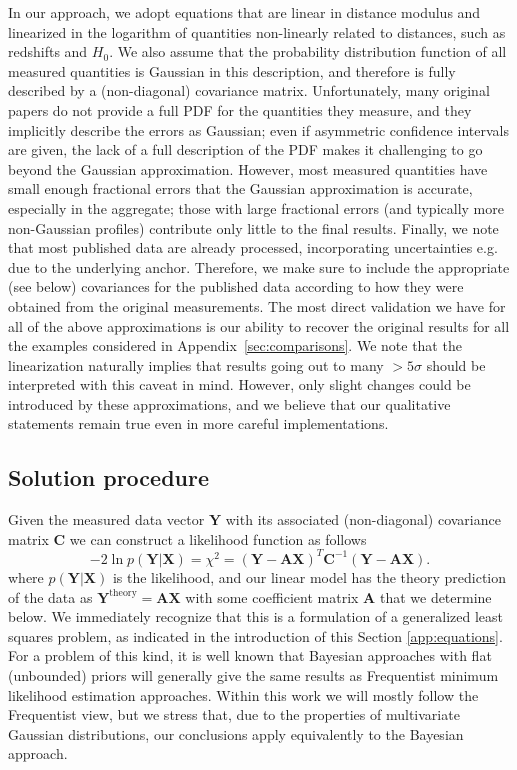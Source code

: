 In our approach, we adopt equations that are linear in distance modulus and linearized in the logarithm of quantities non-linearly related to distances, such as redshifts and $ H_0 $.  We also assume that the probability distribution function of all measured quantities is Gaussian in this description, and therefore is fully described by a (non-diagonal) covariance matrix. Unfortunately, many original papers do not provide a full PDF for the quantities they measure, and they implicitly describe the errors as Gaussian; even if asymmetric confidence intervals are given, the lack of a full description of the PDF makes it challenging to go beyond the Gaussian approximation. However, most measured quantities have small enough fractional errors that the Gaussian approximation is accurate, especially in the aggregate; those with large fractional errors (and typically more non-Gaussian profiles) contribute only little to the final results. Finally, we note that most published data are already processed, incorporating uncertainties e.g. due to the underlying anchor. Therefore, we make sure to include the appropriate (see below) covariances for the published data according to how they were obtained from the original measurements. The most direct validation we have for all of the above approximations is our ability to recover the original results for all the examples considered in Appendix~\ref{sec:comparisons}. We note that the linearization naturally implies that results going out to many $>5\sigma$ should be interpreted with this caveat in mind. However, only slight changes could be introduced by these approximations, and we believe that our qualitative statements remain true even in more careful implementations.

\subsection{Solution procedure}

Given the measured data vector $\mathbf{Y}$ with its associated (non-diagonal) covariance matrix $\mathbf{C}$ we can construct a likelihood function as follows
\begin{equation}
    -2 \ln p(\mathbf{Y}|\mathbf{X}) = \chi^2 = (\mathbf{Y - A X})^T \mathbf {C}^{-1} (\mathbf{Y - A X}).\label{eq:chisq_definition}
\end{equation}
where $p(\mathbf{Y}|\mathbf{X})$ is the likelihood, and our linear model has the theory prediction of the data as $\mathbf{Y}^\mathrm{theory} = \mathbf{A} \mathbf{X}$ with some coefficient matrix $\mathbf{A}$ that we determine below. We immediately recognize that this is a formulation of a generalized least squares problem, as indicated in the introduction of this Section \ref{app:equations}. For a problem of this kind, it is well known that Bayesian approaches with flat (unbounded) priors will generally give the same results as Frequentist minimum likelihood estimation approaches. Within this work we will mostly follow the Frequentist view, but we stress that, due to the properties of multivariate Gaussian distributions, our conclusions apply equivalently to the Bayesian approach.

